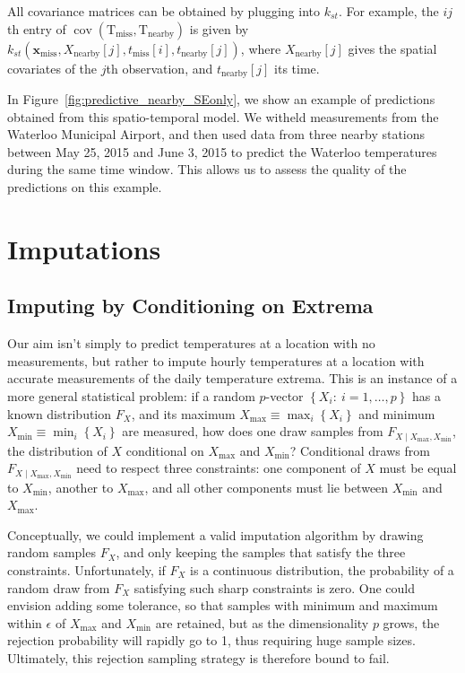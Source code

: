 \documentclass[letter]{article}
\newcommand{\genericdel}[3]{%
      \left#1#3\right#2
    }
\newcommand{\del}[1]{\genericdel(){#1}}
\newcommand{\sbr}[1]{\genericdel[]{#1}}
\newcommand{\cbr}[1]{\genericdel\{\}{#1}}
\DeclareMathOperator{\cov}{{cov}}
\newcommand{\T}{\mathrm{T}}
\newcommand{\xvec}{\mathbold{x}}
\newcommand{\miss}{\mathrm{miss}}
\newcommand{\obs}{\mathrm{nearby}}
\newcommand{\Xmax}{X_{\max}}
\newcommand{\Xmin}{X_{\min}}
\newcommand{\Fcond}{F_{X \mid \Xmax,\Xmin}}
\begin{document}
All covariance matrices can be obtained by plugging into \(k_{st}\). For example, the \(ij\)th entry of \(\cov\del{\T_\miss, \T_\obs}\) is given by \(k_{st}(\xvec_\miss,X_\obs\sbr{j},t_\miss\sbr{i},t_\obs\sbr{j})\), where \(X_\obs\sbr{j}\) gives the spatial covariates of the \(j\)th observation, and \(t_\obs\sbr{j}\) its time.

In Figure~\ref{fig:predictive_nearby_SEonly}, we show an example of predictions obtained from this spatio-temporal model. We witheld measurements from the Waterloo Municipal Airport, and then used data from three nearby stations between May 25, 2015 and June 3, 2015 to predict the Waterloo temperatures during the same time window. This allows us to assess the quality of the predictions on this example.
    


        \section{Imputations}\label{imputations}

\subsection{Imputing by Conditioning on Extrema}\label{imputing-by-conditioning-on-extrema}
    


        Our aim isn't simply to predict temperatures at a location with no measurements, but rather to impute hourly temperatures at a location with accurate measurements of the daily temperature extrema.
This is an instance of a more general statistical problem: if a random \(p\)-vector \(\cbr{X_i:~i=1,\ldots,p}\) has a known distribution \(F_X\), and its maximum \(\Xmax \equiv \max_i\cbr{X_i}\) and minimum \(\Xmin \equiv \min_i\cbr{X_i}\) are measured, how does one draw samples from \(\Fcond\), the distribution of \(X\) conditional on \(\Xmax\) and \(\Xmin\)?
Conditional draws from \(\Fcond\) need to respect three constraints: one component of \(X\) must be equal to \(\Xmin\), another to \(\Xmax\), and all other components must lie between \(\Xmin\) and \(\Xmax\).
    


        Conceptually, we could implement a valid imputation algorithm by drawing random samples \(F_X\),
and only keeping the samples that satisfy the three constraints.
Unfortunately, if \(F_X\) is a continuous distribution, the probability of a random draw from \(F_X\) satisfying such sharp constraints is zero.
One could envision adding some tolerance, so that samples with minimum and maximum within \(\epsilon\) of \(\Xmax\) and \(\Xmin\) are retained, but as the dimensionality \(p\) grows, the rejection probability will rapidly go to 1, thus requiring huge sample sizes.
Ultimately, this rejection sampling strategy is therefore bound to fail.
    
\end{document}

